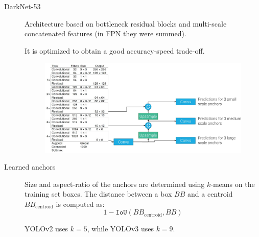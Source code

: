 \begin{description}
        \begin{description}
            \item[DarkNet-53]
                Architecture based on bottleneck residual blocks and multi-scale concatenated features (in FPN they were summed).

                It is optimized to obtain a good accuracy-speed trade-off.

                \begin{figure}[H]
                    \centering
                    \includegraphics[width=0.8\linewidth]{./img/_darknet.jpg}
                \end{figure}

            \item[Learned anchors] 
                Size and aspect-ratio of the anchors are determined using $k$-means on the training set boxes. The distance between a box $BB$ and a centroid $BB_\text{centroid}$ is computed as:
                \[ 1 - \texttt{IoU}(BB_\text{centroid}, BB) \]

                \begin{remark}
                    YOLOv2 uses $k=5$, while YOLOv3 uses $k=9$.
                \end{remark}
        \end{description}
\end{description}

